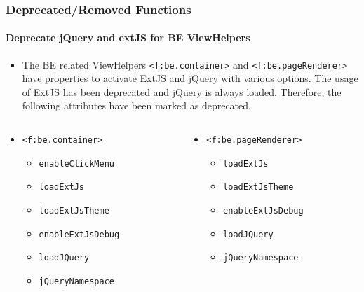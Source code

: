 
\begin{frame}[fragile]
	\frametitle{Deprecated/Removed Functions}
	\framesubtitle{Deprecate jQuery and extJS for BE ViewHelpers}

	\begin{itemize}
		\item The BE related ViewHelpers \texttt{<f:be.container>} and \texttt{<f:be.pageRenderer>}
			have properties to activate ExtJS and jQuery with various options. The usage of ExtJS
			has been deprecated and jQuery is always loaded. Therefore, the following attributes
			have been marked as deprecated.
	\end{itemize}

	\begin{columns}[T]
		\begin{column}{0.5\textwidth}
			\begin{itemize}
				\item \texttt{<f:be.container>}
					\begin{itemize}
						\item \texttt{enableClickMenu}
						\item \texttt{loadExtJs}
						\item \texttt{loadExtJsTheme}
						\item \texttt{enableExtJsDebug}
						\item \texttt{loadJQuery}
						\item \texttt{jQueryNamespace}
					\end{itemize}
			\end{itemize}
		\end{column}

		\begin{column}{0.5\textwidth}
			\begin{itemize}
				\item \texttt{<f:be.pageRenderer>}
					\begin{itemize}
						\item \texttt{loadExtJs}
						\item \texttt{loadExtJsTheme}
						\item \texttt{enableExtJsDebug}
						\item \texttt{loadJQuery}
						\item \texttt{jQueryNamespace}
					\end{itemize}
			\end{itemize}
		\end{column}
	\end{columns}

\end{frame}

